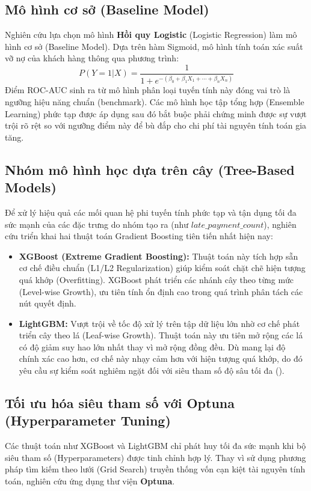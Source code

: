 \subsection{Mô hình cơ sở (Baseline Model)}
Nghiên cứu lựa chọn mô hình \textbf{Hồi quy Logistic} (Logistic Regression) làm mô hình cơ sở (Baseline Model). Dựa trên hàm Sigmoid, mô hình tính toán xác suất vỡ nợ của khách hàng thông qua phương trình:
\begin{equation}
    P(Y=1|X) = \frac{1}{1 + e^{-(\beta_0 + \beta_1 X_1 + \cdots + \beta_n X_n)}}
\end{equation}
Điểm ROC-AUC sinh ra từ mô hình phân loại tuyến tính này đóng vai trò là ngưỡng hiệu năng chuẩn (benchmark). Các mô hình học tập tổng hợp (Ensemble Learning) phức tạp được áp dụng sau đó bắt buộc phải chứng minh được sự vượt trội rõ rệt so với ngưỡng điểm này để bù đắp cho chi phí tài nguyên tính toán gia tăng.

\subsection{Nhóm mô hình học dựa trên cây (Tree-Based Models)}
Để xử lý hiệu quả các mối quan hệ phi tuyến tính phức tạp và tận dụng tối đa sức mạnh của các đặc trưng do nhóm tạo ra (như $late\_payment\_count$), nghiên cứu triển khai hai thuật toán Gradient Boosting tiên tiến nhất hiện nay:
\begin{itemize}
    \item \textbf{XGBoost (Extreme Gradient Boosting):} Thuật toán này tích hợp sẵn cơ chế điều chuẩn (L1/L2 Regularization) giúp kiểm soát chặt chẽ hiện tượng quá khớp (Overfitting). XGBoost phát triển các nhánh cây theo từng mức (Level-wise Growth), ưu tiên tính ổn định cao trong quá trình phân tách các nút quyết định.
    \item \textbf{LightGBM:} Vượt trội về tốc độ xử lý trên tập dữ liệu lớn nhờ cơ chế phát triển cây theo lá (Leaf-wise Growth). Thuật toán này ưu tiên mở rộng các lá có độ giảm suy hao lớn nhất thay vì mở rộng đồng đều. Dù mang lại độ chính xác cao hơn, cơ chế này nhạy cảm hơn với hiện tượng quá khớp, do đó yêu cầu sự kiểm soát nghiêm ngặt đối với siêu tham số độ sâu tối đa ().
\end{itemize}

\subsection{Tối ưu hóa siêu tham số với Optuna (Hyperparameter Tuning)}
Các thuật toán như XGBoost và LightGBM chỉ phát huy tối đa sức mạnh khi bộ siêu tham số (Hyperparameters) được tinh chỉnh hợp lý. Thay vì sử dụng phương pháp tìm kiếm theo lưới (Grid Search) truyền thống vốn cạn kiệt tài nguyên tính toán, nghiên cứu ứng dụng thư viện \textbf{Optuna}.

